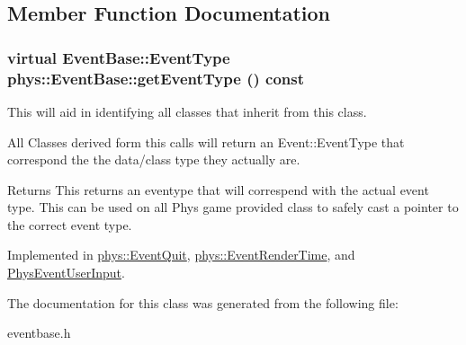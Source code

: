 \subsection{Member Function Documentation}
\hypertarget{classphys_1_1EventBase_a0f39a25f4b64f7cf701e174454616366}{
\subsubsection[{getEventType}]{\setlength{\rightskip}{0pt plus 5cm}virtual {\bf EventBase::EventType} phys::EventBase::getEventType () const}}
\label{dd/d80/classphys_1_1EventBase_a0f39a25f4b64f7cf701e174454616366}


This will aid in identifying all classes that inherit from this class. 

All Classes derived form this calls will return an Event::EventType that correspond the the data/class type they actually are. \begin{DoxyReturn}{Returns}
This returns an eventype that will correspend with the actual event type. This can be used on all Phys game provided class to safely cast a pointer to the correct event type. 
\end{DoxyReturn}


Implemented in \hyperlink{classphys_1_1EventQuit_ad996640acbb58d2a17fc405de6515c93}{phys::EventQuit}, \hyperlink{classphys_1_1EventRenderTime_a76a47983d5aa197104cc3c0b9dea9dfa}{phys::EventRenderTime}, and \hyperlink{classPhysEventUserInput_ab3c989e3ce256db32bd46d1b8d4c2014}{PhysEventUserInput}.



The documentation for this class was generated from the following file:\begin{DoxyCompactItemize}
\item 
eventbase.h\end{DoxyCompactItemize}

